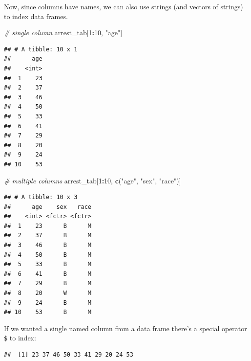 \documentclass[12pt,]{book}
\newenvironment{Shaded}{\begin{snugshade}}{\end{snugshade}}
\newcommand{\KeywordTok}[1]{\textcolor[rgb]{0.13,0.29,0.53}{\textbf{#1}}}
\newcommand{\DecValTok}[1]{\textcolor[rgb]{0.00,0.00,0.81}{#1}}
\newcommand{\StringTok}[1]{\textcolor[rgb]{0.31,0.60,0.02}{#1}}
\newcommand{\CommentTok}[1]{\textcolor[rgb]{0.56,0.35,0.01}{\textit{#1}}}
\newcommand{\OperatorTok}[1]{\textcolor[rgb]{0.81,0.36,0.00}{\textbf{#1}}}
\newcommand{\NormalTok}[1]{#1}
\theoremstyle{definition}
\theoremstyle{definition}
\theoremstyle{remark}
\begin{document}
Now, since columns have names, we can also use strings (and vectors of
strings) to index data frames.

\begin{Shaded}
\begin{Highlighting}[]
\CommentTok{# single column}
\NormalTok{arrest_tab[}\DecValTok{1}\OperatorTok{:}\DecValTok{10}\NormalTok{, }\StringTok{"age"}\NormalTok{]}
\end{Highlighting}
\end{Shaded}

\begin{verbatim}
## # A tibble: 10 x 1
##      age
##    <int>
##  1    23
##  2    37
##  3    46
##  4    50
##  5    33
##  6    41
##  7    29
##  8    20
##  9    24
## 10    53
\end{verbatim}

\begin{Shaded}
\begin{Highlighting}[]
\CommentTok{# multiple columns}
\NormalTok{arrest_tab[}\DecValTok{1}\OperatorTok{:}\DecValTok{10}\NormalTok{, }\KeywordTok{c}\NormalTok{(}\StringTok{"age"}\NormalTok{, }\StringTok{"sex"}\NormalTok{, }\StringTok{"race"}\NormalTok{)]}
\end{Highlighting}
\end{Shaded}

\begin{verbatim}
## # A tibble: 10 x 3
##      age    sex   race
##    <int> <fctr> <fctr>
##  1    23      B      M
##  2    37      B      M
##  3    46      B      M
##  4    50      B      M
##  5    33      B      M
##  6    41      B      M
##  7    29      B      M
##  8    20      W      M
##  9    24      B      M
## 10    53      B      M
\end{verbatim}

If we wanted a single named column from a data frame there's a special
operator \texttt{\$} to index:

\begin{Shaded}
\end{Shaded}

\begin{verbatim}
##  [1] 23 37 46 50 33 41 29 20 24 53
\end{verbatim}
\end{document}
